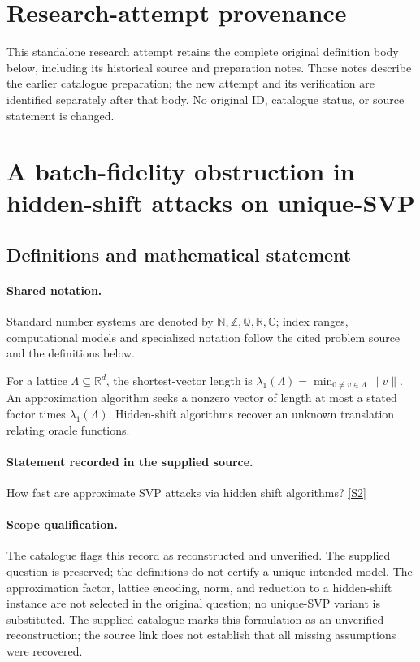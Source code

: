 \documentclass[11pt]{article}
\begin{document}
\section*{Research-attempt provenance}
This standalone research attempt retains the complete original definition body below,
including its historical source and preparation notes. Those notes describe the
earlier catalogue preparation; the new attempt and its verification are identified
separately after that body. No original ID, catalogue status, or source statement is changed.

\section{A batch-fidelity obstruction in hidden-shift attacks on unique-SVP}\label{statement}

\subsection{Definitions and mathematical statement}

\paragraph{Shared notation.}Standard number systems are denoted by $\mathbb N,\mathbb Z,\mathbb Q,\mathbb R,\mathbb C$; index ranges, computational models and specialized notation follow the cited problem source and the definitions below.


For a lattice $\Lambda\subseteq\mathbb R^d$, the shortest-vector length is $\lambda_1(\Lambda)=\min_{0\ne v\in\Lambda}\|v\|$. An approximation algorithm seeks a nonzero vector of length at most a stated factor times $\lambda_1(\Lambda)$. Hidden-shift algorithms recover an unknown translation relating oracle functions.
\paragraph{Statement recorded in the supplied source.}
How fast are approximate SVP attacks via hidden shift algorithms? \href{http://aimpl.org/quantumalg/4/}{[S2]}
\paragraph{Scope qualification.}
The catalogue flags this record as reconstructed and unverified. The supplied question is preserved; the definitions do not certify a unique intended model. The approximation factor, lattice encoding, norm, and reduction to a hidden-shift instance are not selected in the original question; no unique-SVP variant is substituted.
The supplied catalogue marks this formulation as an unverified reconstruction; the source link does not establish that all missing assumptions were recovered.
\end{document}

